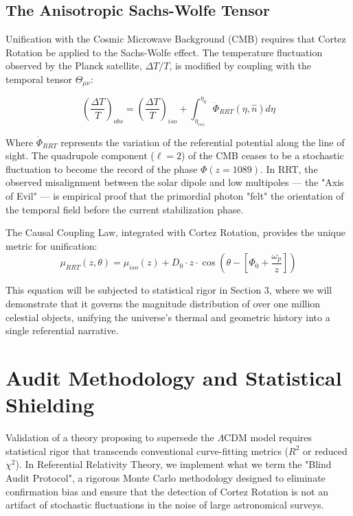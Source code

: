 \documentclass[12pt, a4paper]{article}
\begin{document}
\subsection{The Anisotropic Sachs-Wolfe Tensor}

Unification with the Cosmic Microwave Background (CMB) requires that Cortez Rotation be applied to the Sachs-Wolfe effect. The temperature fluctuation observed by the Planck satellite, $\Delta T/T$, is modified by coupling with the temporal tensor $\Theta_{\mu\nu}$:

\begin{equation}
\left( \frac{\Delta T}{T} \right)_{obs} = \left( \frac{\Delta T}{T} \right)_{iso} + \int_{\eta_{rec}}^{\eta_0} \dot{\Phi}_{RRT}(\eta, \hat{n}) d\eta
\end{equation}

Where $\dot{\Phi}_{RRT}$ represents the variation of the referential potential along the line of sight. The quadrupole component ($\ell=2$) of the CMB ceases to be a stochastic fluctuation to become the record of the phase $\Phi(z=1089)$. In RRT, the observed misalignment between the solar dipole and low multipoles --- the "Axis of Evil" --- is empirical proof that the primordial photon "felt" the orientation of the temporal field before the current stabilization phase. 

The Causal Coupling Law, integrated with Cortez Rotation, provides the unique metric for unification:
\begin{equation}
\mu_{RRT}(z, \theta) = \mu_{iso}(z) + D_0 \cdot z \cdot \cos\left( \theta - [\Phi_0 + \frac{\omega_p}{z}] \right)
\end{equation}

This equation will be subjected to statistical rigor in Section 3, where we will demonstrate that it governs the magnitude distribution of over one million celestial objects, unifying the universe's thermal and geometric history into a single referential narrative.

\section{Audit Methodology and Statistical Shielding}

Validation of a theory proposing to supersede the $\Lambda$CDM model requires statistical rigor that transcends conventional curve-fitting metrics ($R^2$ or reduced $\chi^2$). In Referential Relativity Theory, we implement what we term the "Blind Audit Protocol", a rigorous Monte Carlo methodology designed to eliminate confirmation bias and ensure that the detection of Cortez Rotation is not an artifact of stochastic fluctuations in the noise of large astronomical surveys.
\end{document}
